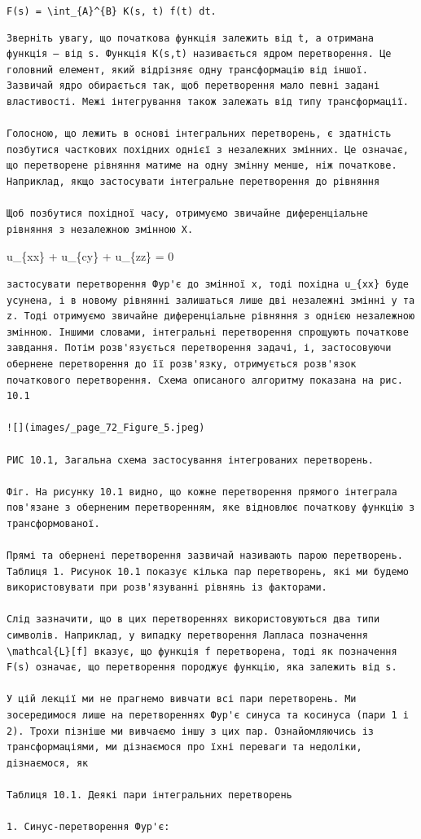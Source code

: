 \documentclass[
  ukrainian,
]{article}
\begin{document}
\texttt{F(s)\ =\ \textbackslash{}int\_\{A\}\^{}\{B\}\ K(s,\ t)\ f(t)\ dt.}

\begin{verbatim}
Зверніть увагу, що початкова функція залежить від t, а отримана функція — від s. Функція K(s,t) називається ядром перетворення. Це головний елемент, який відрізняє одну трансформацію від іншої. Зазвичай ядро обирається так, щоб перетворення мало певні задані властивості. Межі інтегрування також залежать від типу трансформації.

Голосною, що лежить в основі інтегральних перетворень, є здатність позбутися часткових похідних однієї з незалежних змінних. Це означає, що перетворене рівняння матиме на одну змінну менше, ніж початкове. Наприклад, якщо застосувати інтегральне перетворення до рівняння

Щоб позбутися похідної часу, отримуємо звичайне диференціальне рівняння з незалежною змінною X.
\end{verbatim}

u\_\{xx\} + u\_\{cy\} + u\_\{zz\} = 0

\begin{verbatim}
застосувати перетворення Фур'є до змінної x, тоді похідна u_{xx} буде усунена, і в новому рівнянні залишаться лише дві незалежні змінні y та z. Тоді отримуємо звичайне диференціальне рівняння з однією незалежною змінною. Іншими словами, інтегральні перетворення спрощують початкове завдання. Потім розв'язується перетворення задачі, і, застосовуючи обернене перетворення до її розв'язку, отримується розв'язок початкового перетворення. Схема описаного алгоритму показана на рис. 10.1

![](images/_page_72_Figure_5.jpeg)

РИС 10.1, Загальна схема застосування інтегрованих перетворень.

Фіг. На рисунку 10.1 видно, що кожне перетворення прямого інтеграла пов'язане з оберненим перетворенням, яке відновлює початкову функцію з трансформованої.

Прямі та обернені перетворення зазвичай називають парою перетворень. Таблиця 1. Рисунок 10.1 показує кілька пар перетворень, які ми будемо використовувати при розв'язуванні рівнянь із факторами.

Слід зазначити, що в цих перетвореннях використовуються два типи символів. Наприклад, у випадку перетворення Лапласа позначення \mathcal{L}[f] вказує, що функція f перетворена, тоді як позначення F(s) означає, що перетворення породжує функцію, яка залежить від s.

У цій лекції ми не прагнемо вивчати всі пари перетворень. Ми зосередимося лише на перетвореннях Фур'є синуса та косинуса (пари 1 і 2). Трохи пізніше ми вивчаємо іншу з цих пар. Ознайомляючись із трансформаціями, ми дізнаємося про їхні переваги та недоліки, дізнаємося, як

Таблиця 10.1. Деякі пари інтегральних перетворень

1. Синус-перетворення Фур'є:
\end{verbatim}
\end{document}

